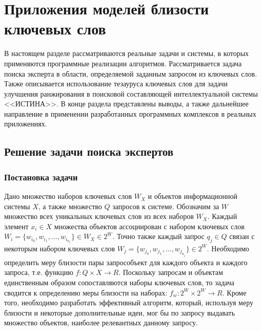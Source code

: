 \chapter{Приложения моделей близости ключевых слов} \label{chapt_applications}
В настоящем разделе рассматриваются реальные задачи и системы, в которых применяются программные реализации алгоритмов. 
Рассматривается задача поиска эксперта в области, определяемой заданным запросом из ключевых слов.
Также описывается использование тезауруса ключевых слов для задачи улучшения ранжирования в поисковой составляющей интеллектуальной системы <<ИСТИНА>>.
В конце раздела представлены выводы, а также дальнейшее направление в применении разработанных программных комплексов в реальных приложениях.

\section{Решение задачи поиска экспертов} \label{expert_search}
\subsection{Постановка задачи}
Дано множество наборов ключевых слов $W_X$ и объектов информационной системы $X$, а также множество $Q$ запросов к системе. Обозначим за $W$ множество всех уникальных ключевых слов из всех наборов $W_X$. Каждый элемент $x_i \in X$ множества объектов ассоциирован с набором ключевых слов $W_i = \{w_{i_0}, w_{i_1}, ..., w_{i_{n_i}} \} \in W_X \in 2^W$. Точно также каждый запрос $q_j \in Q$ связан с некоторым набором ключевых слов $W_j = \{w_{j_0}, w_{j_1}, ..., w_{j_{n_j}} \} \in 2^W$. Необходимо определить меру близости пары запрос­объект для каждого объекта и каждого запроса, т.е.  функцию $f : Q \times X \rightarrow R$. Поскольку запросам и объектам единственным образом сопоставляются наборы ключевых слов, то задача сводится к определению меры близости на наборах: $f_w : 2^W \times 2^W \rightarrow R$. Кроме того, необходимо разработать эффективный алгоритм, который, используя меру близости и некоторые дополнительные идеи, мог бы по запросу выдавать множество объектов, наиболее релевантных данному запросу.
